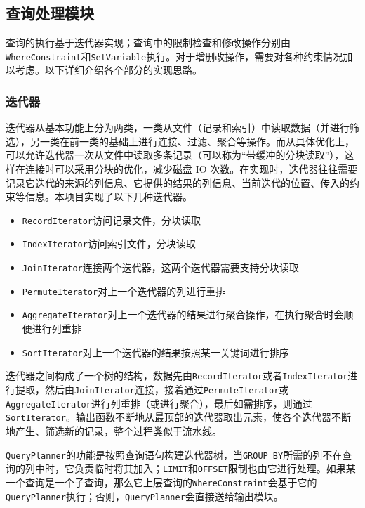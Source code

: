 \documentclass{ctexart}
\begin{document}
\subsection{查询处理模块}
查询的执行基于迭代器实现；查询中的限制检查和修改操作分别由\texttt{WhereConstraint}和\texttt{SetVariable}执行。对于增删改操作，需要对各种约束情况加以考虑。以下详细介绍各个部分的实现思路。

\subsubsection{迭代器}
迭代器从基本功能上分为两类，一类从文件（记录和索引）中读取数据（并进行筛选），另一类在前一类的基础上进行连接、过滤、聚合等操作。而从具体优化上，可以允许迭代器一次从文件中读取多条记录（可以称为“带缓冲的分块读取”），这样在连接时可以采用分块的优化，减少磁盘 IO 次数。在实现时，迭代器往往需要记录它迭代的来源的列信息、它提供的结果的列信息、当前迭代的位置、传入的约束等信息。本项目实现了以下几种迭代器。
\begin{itemize}
	\item \texttt{RecordIterator}访问记录文件，分块读取
	\item \texttt{IndexIterator}访问索引文件，分块读取
	\item \texttt{JoinIterator}连接两个迭代器，这两个迭代器需要支持分块读取
	\item \texttt{PermuteIterator}对上一个迭代器的列进行重排
	\item \texttt{AggregateIterator}对上一个迭代器的结果进行聚合操作，在执行聚合时会顺便进行列重排
	\item \texttt{SortIterator}对上一个迭代器的结果按照某一关键词进行排序
\end{itemize}
迭代器之间构成了一个树的结构，数据先由\texttt{RecordIterator}或者\texttt{IndexIterator}进行提取，然后由\texttt{JoinIterator}连接，接着通过\texttt{PermuteIterator}或\texttt{AggregateIterator}进行列重排（或进行聚合），最后如需排序，则通过\texttt{SortIterator}。输出函数不断地从最顶部的迭代器取出元素，使各个迭代器不断地产生、筛选新的记录，整个过程类似于流水线。

\texttt{QueryPlanner}的功能是按照查询语句构建迭代器树，当\texttt{GROUP BY}所需的列不在查询的列中时，它负责临时将其加入；\texttt{LIMIT}和\texttt{OFFSET}限制也由它进行处理。如果某一个查询是一个子查询，那么它上层查询的\texttt{WhereConstraint}会基于它的\texttt{QueryPlanner}执行；否则，\texttt{QueryPlanner}会直接送给输出模块。
\end{document}
